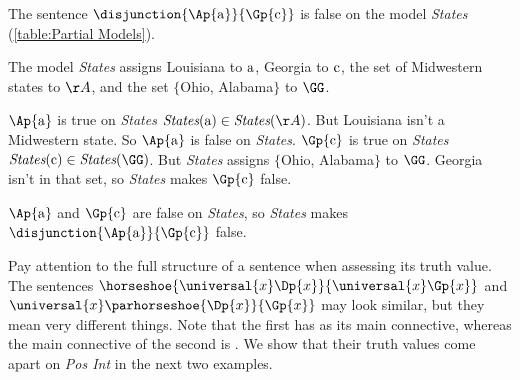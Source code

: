 \begin{majorILnc}{}
The sentence $\disjunction{\Ap{\constant{a}}}{\Gp{\constant{c}}}$ is false on the model \emph{States} (\ref{table:Partial Models}).
\end{majorILnc}
\begin{PROOF}
The model \emph{States} assigns Louisiana to $\mathrm{a}$, Georgia to $\mathrm{c}$, the set of Midwestern states to $\AA$, and the set $\{$Ohio, Alabama$\}$ to $\GG$.

$\Ap{\constant{a}}$ is true on \emph{States} \Iff $\emph{States}(\constant{a})\in\emph{States}(\AA)$.
But Louisiana isn't a Midwestern state.
So $\Ap{\constant{a}}$ is false on \emph{States}.
$\Gp{\constant{c}}$ is true on \emph{States} \Iff $\emph{States}(\constant{c})\in\emph{States}(\GG)$.
But \emph{States} assigns $\{$Ohio, Alabama$\}$ to $\GG$.
Georgia isn't in that set, so \emph{States} makes $\Gp{\constant{c}}$ false.

$\Ap{\constant{a}}$ and $\Gp{\constant{c}}$ are false on \emph{States}, so \emph{States} makes $\disjunction{\Ap{\constant{a}}}{\Gp{\constant{c}}}$ false.
\end{PROOF}
\noindent{}Pay attention to the full structure of a sentence when assessing its truth value.
The sentences $\horseshoe{\universal{\variable{x}}\Dp{\variable{x}}}{\universal{\variable{x}}\Gp{\variable{x}}}$ and $\universal{\variable{x}}\parhorseshoe{\Dp{\variable{x}}}{\Gp{\variable{x}}}$ may look similar, but they mean very different things.
Note that the first has \mention{$\HORSESHOE$} as its main connective, whereas the main connective of the second is \mention{$\forall$}.
We show that their truth values come apart on \emph{Pos Int} in the next two examples.

